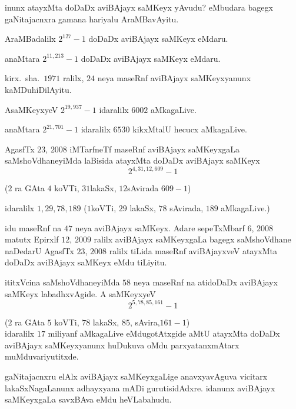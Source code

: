 inunx atayxMta doDaDx aviBAjayx saMKeyx yAvudu? eMbudara bagegx gaNitajacnxra gamana hariyalu AraMBavAyitu.

AraMBadalilx $2^{127}-1$ doDaDx aviBAjayx saMKeyx eMdaru.

anaMtara $2^{11,213}-1$ doDaDx aviBAjayx saMKeyx eMdaru.

kirx.~sha.\ $1971$ ralilx, $24$ neya maseRnf aviBAjayx saMKeyxyanunx kaMDuhiDilAyitu.

AsaMKeyxyeV $2^{19,937}-1$ idaralilx $6002$ aMkagaLive.

anaMtara $2^{21,701}-1$ idaralilx $6530$ kikxMtalU hecucx aMkagaLive.

AgasfTx $23$, $2008$ iMTarfneTf maseRnf aviBAjayx saMKeyxgaLa \-saMshoVdhaneyiMda laBisida atayxMta doDaDx aviBAjayx saMKeyx
$$ 
2^{4,31,12,609}-1
$$

($2$ ra GAta $4$ koVTi, $31$lakaSx, $12$sAvirada $609-1$)

idaralilx $1,29,78,189$ ($1$koVTi, $29$ lakaSx, $78$ sAvirada, $189$ aMkagaLive.)

idu maseRnf na $47$ neya aviBAjayx saMKeyx. Adare sepeTxMbarf $6$, $2008$ matutx Epirxlf $12$, $2009$ ralilx aviBAjayx saMKeyxgaLa bagegx saMshoVdhane naDedarU AgasfTx $23$, $2008$ ralilx tiLida maseRnf aviBAjayxveV atayxMta doDaDx aviBAjayx saMKeyx eMdu tiLiyitu. 

ititxVcina saMshoVdhaneyiMda $58$ neya maseRnf na atidoDaDx aviBAjayx saMKeyx labadhxvAgide. A saMKeyxyeV 
$$
2^{5,78,85,161}-1
$$

($2$ ra GAta $5$ koVTi, $78$ lakaSx, $85$, sAvira,$161 - 1$)\\
idaralilx $17$ miliyanf aMkagaLive eMdugotAtxgide aMtU atayxMta doDaDx aviBAjayx saMKeyxyanunx huDukuva oMdu parxyatanxmAtarx muMduvariyutitxde.

gaNitajacnxru elAlx aviBAjayx saMKeyxgaLige anavxyavAguva vicitarx lakaSxNagaLanunx adhayxyana mADi gurutisidAdxre. idanunx aviBAjayx saMKeyxgaLa savxBAva eMdu heVLa\-bahudu.

